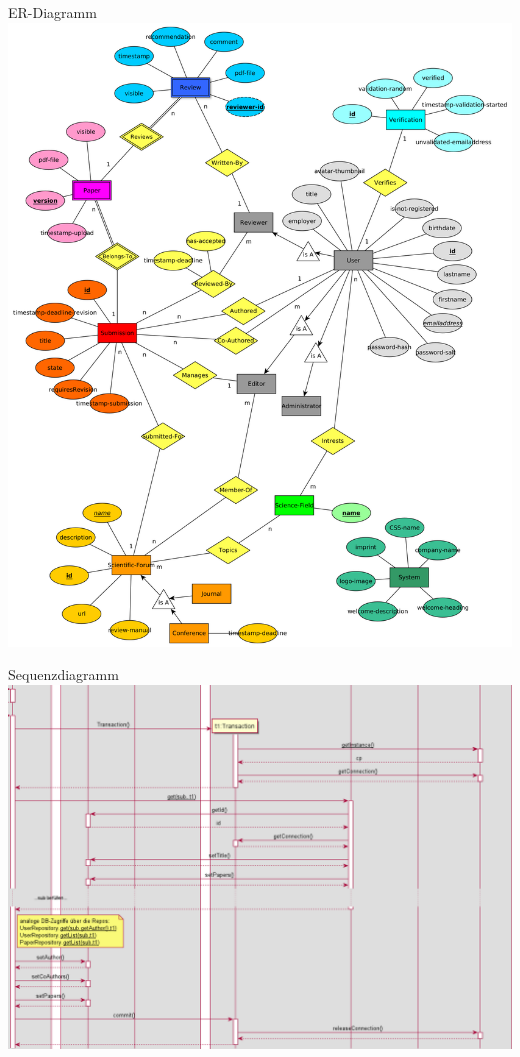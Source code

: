\documentclass{beamer}
\begin{document}
    \begin{frame}{ER-Diagramm}
        \centering
        \includegraphics[height=0.9\textheight]{../../docs/Entwurf/graphics/ER-Modell.png}
    \end{frame}

    \begin{frame}{Sequenzdiagramm}
        \centering
        \includegraphics[height=0.8\textheight]{excerpts/sequence1_2}
    \end{frame}
\end{document}
